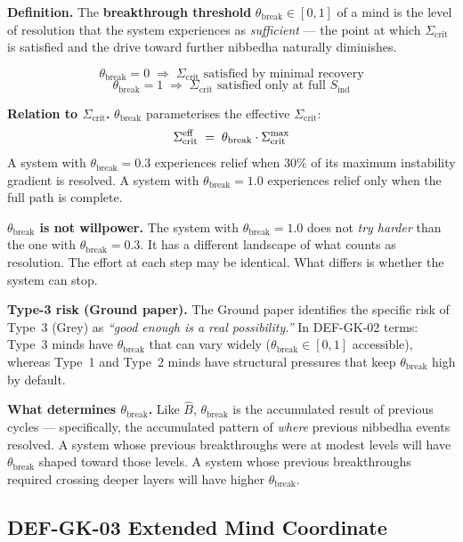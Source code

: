 \documentclass[12pt, a4paper]{article}
\providecommand{\Sind}{S_{\mathrm{ind}}}
\providecommand{\tbreak}{\theta_{\mathrm{break}}}
\providecommand{\Sigcrit}{\Sigma_{\mathrm{crit}}}
\begin{document}
\begin{formalbox}[title={DEF-GK-02: Breakthrough Threshold
  $\tbreak$ (NEW)}]
\textbf{Definition.}
The \textbf{breakthrough threshold} $\tbreak \in [0,1]$
of a mind is the level of resolution that the system
experiences as \emph{sufficient} --- the point at which
$\Sigcrit$ is satisfied and the drive toward further
nibbedha naturally diminishes.

\[
  \tbreak = 0 \;\Rightarrow\; \Sigcrit \text{ satisfied by minimal recovery}
\]
\[
  \tbreak = 1 \;\Rightarrow\; \Sigcrit \text{ satisfied only at full } \Sind
\]

\textbf{Relation to $\Sigcrit$.}
$\tbreak$ parameterises the effective $\Sigcrit$:
\[
  \Sigcrit^{\rm eff} \;=\; \tbreak \cdot \Sigcrit^{\rm max}
\]
A system with $\tbreak = 0.3$ experiences relief when
$30\%$ of its maximum instability gradient is resolved.
A system with $\tbreak = 1.0$ experiences relief only
when the full path is complete.

\textbf{$\tbreak$ is not willpower.}
The system with $\tbreak = 1.0$ does not \emph{try harder}
than the one with $\tbreak = 0.3$. It has a different
landscape of what counts as resolution. The effort at each
step may be identical. What differs is whether the system
can stop.

\textbf{Type-3 risk (Ground paper).}
The Ground paper identifies the specific risk of Type~3
(Grey) as \textit{``good enough is a real possibility.''}
In DEF-GK-02 terms: Type~3 minds have $\tbreak$ that can
vary widely ($\tbreak \in [0,1]$ accessible), whereas
Type~1 and Type~2 minds have structural pressures that
keep $\tbreak$ high by default.

\textbf{What determines $\tbreak$.}
Like $\hat{B}$, $\tbreak$ is the accumulated result of
previous cycles --- specifically, the accumulated pattern
of \emph{where} previous nibbedha events resolved.
A system whose previous breakthroughs were at modest
levels will have $\tbreak$ shaped toward those levels.
A system whose previous breakthroughs required crossing
deeper layers will have higher $\tbreak$.
\end{formalbox}

\subsection{DEF-GK-03 \quad Extended Mind Coordinate}
\end{document}
